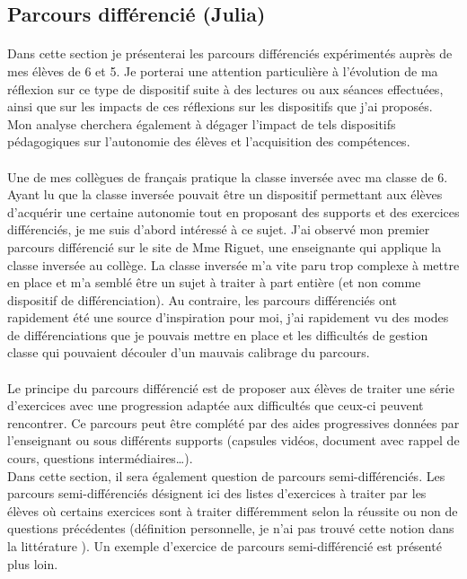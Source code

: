 \subsection{Parcours différencié (Julia)}
\paragraph{} Dans cette section je présenterai les parcours différenciés expérimentés auprès de mes élèves de 6 et 5. Je porterai une attention particulière à l'évolution de ma réflexion sur ce type de dispositif suite à des lectures ou aux séances effectuées, ainsi que sur les impacts de ces réflexions sur les dispositifs que j'ai proposés. Mon analyse cherchera également à dégager l'impact de tels dispositifs pédagogiques sur l'autonomie des élèves et l'acquisition des compétences.
\paragraph{}Une de mes collègues de français pratique la classe inversée avec ma classe de 6. Ayant lu que la classe inversée\cite{cnesco_Lafontaine}\cite{cnesco_notes_experts} pouvait être un dispositif permettant aux élèves d'acquérir une certaine autonomie tout en proposant des supports et des exercices différenciés, je me suis d'abord intéressé à ce sujet. J'ai observé mon premier parcours différencié sur le site de Mme Riguet\cite{Riguet}, une enseignante qui applique la classe inversée au collège. La classe inversée m'a vite paru trop complexe à mettre en place et m'a semblé être un sujet à traiter à part entière (et non comme dispositif de différenciation). Au contraire, les parcours différenciés ont rapidement été une source d'inspiration pour moi, j'ai rapidement vu des modes de différenciations que je pouvais mettre en place et les difficultés de gestion classe qui pouvaient découler d'un mauvais calibrage du parcours.
\paragraph{}Le principe du parcours différencié est de proposer aux élèves de traiter une série d'exercices avec une progression adaptée aux difficultés que ceux-ci peuvent rencontrer. Ce parcours peut être complété par des aides progressives données par l'enseignant ou sous différents supports (capsules vidéos, document avec rappel de cours, questions intermédiaires\ldots ). \\
Dans cette section, il sera également question de parcours semi-différenciés. Les parcours semi-différenciés désignent ici des listes d'exercices à traiter par les élèves où certains exercices sont à traiter différemment selon la réussite ou non de questions précédentes (définition personnelle, je n'ai pas trouvé cette notion dans la littérature ). Un exemple d'exercice de parcours semi-différencié est présenté plus loin.
